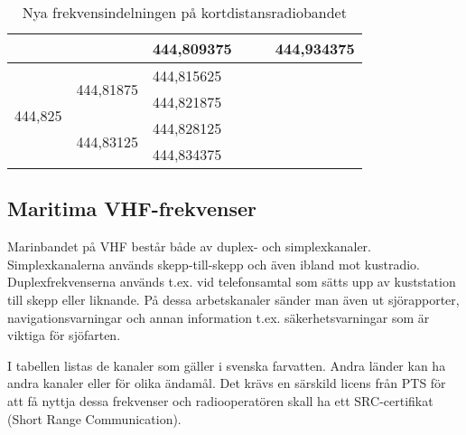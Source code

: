 \begin{table}[h]
\begin{tabular}{|l|l|l|l|l|l|}
		                                               &                                                 & 444,809375                      & \multicolumn{1}{l|}{}                         & \multicolumn{1}{l|}{}                           & \multicolumn{1}{l|}{444,934375} \\ \hline
		\multirow{4}{*}{444,825}                       & \multirow{2}{*}{444,81875}                      & 444,815625                      & \multicolumn{3}{l}{\multirow{4}{*}{}}                                                                                             \\ \cline{3-3}
		                                               &                                                 & 444,821875                      & \multicolumn{3}{l}{}                                                                                                              \\ \cline{2-3}
		                                               & \multirow{2}{*}{444,83125}                      & 444,828125                      & \multicolumn{3}{l}{}                                                                                                              \\ \cline{3-3}
		                                               &                                                 & 444,834375                      & \multicolumn{3}{l}{}                                                                                                              \\ \cline{1-3}
	\end{tabular}
\caption{Nya frekvensindelningen på kortdistansradiobandet}
\end{table}

\subsection{Maritima VHF-frekvenser}

Marinbandet på VHF består både av duplex- och simplexkanaler. Simplexkanalerna används skepp-till-skepp och även ibland mot kustradio. Duplexfrekvenserna används t.ex. vid telefonsamtal som sätts upp av kuststation till skepp eller liknande. På dessa arbetskanaler sänder man även ut sjörapporter, navigationsvarningar och annan information t.ex. säkerhetsvarningar som är viktiga för sjöfarten.

I tabellen listas de kanaler som gäller i svenska farvatten. Andra länder kan ha andra kanaler eller för olika ändamål. Det krävs en särskild licens från PTS för att få nyttja dessa frekvenser och radiooperatören skall ha ett SRC-certifikat (Short Range Communication).

